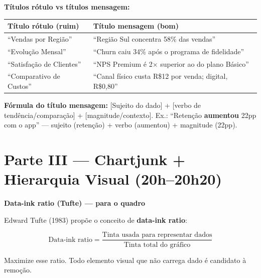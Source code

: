 \begin{SolvedBox}
\textbf{Títulos rótulo vs títulos mensagem:}

\begin{tabular}{|l|l|}
\hline
\textbf{Título rótulo (ruim)} & \textbf{Título mensagem (bom)} \\
\hline
``Vendas por Região'' & ``Região Sul concentra 58\% das vendas'' \\
``Evolução Mensal'' & ``Churn caiu 34\% após o programa de fidelidade'' \\
``Satisfação de Clientes'' & ``NPS Premium é 2× superior ao do plano Básico'' \\
``Comparativo de Custos'' & ``Canal físico custa R\$12 por venda; digital, R\$0,80'' \\
\hline
\end{tabular}

\textbf{Fórmula do título mensagem:} [Sujeito do dado] + [verbo de tendência/comparação]
+ [magnitude/contexto]. Ex.: ``Retenção \textbf{aumentou} 22pp com o app'' —
sujeito (retenção) + verbo (aumentou) + magnitude (22pp).
\end{SolvedBox}

\section{Parte III — Chartjunk + Hierarquia Visual (20h–20h20)}

\begin{BoardBox}
\textbf{Data-ink ratio (Tufte) — para o quadro}

Edward Tufte (1983) propõe o conceito de \textbf{data-ink ratio}:

\[
\text{Data-ink ratio} = \frac{\text{Tinta usada para representar dados}}{\text{Tinta total do gráfico}}
\]

Maximize esse ratio. Todo elemento visual que não carrega dado é candidato
à remoção.
\end{BoardBox}

